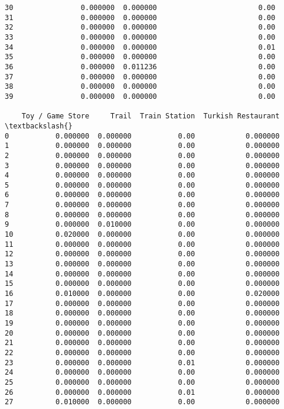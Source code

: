 \documentclass[11pt]{article}
\begin{document}
\begin{tcolorbox}[breakable, size=fbox, boxrule=.5pt, pad at break*=1mm, opacityfill=0]
\begin{Verbatim}[commandchars=\\\{\}]
30                0.000000  0.000000                        0.00
31                0.000000  0.000000                        0.00
32                0.000000  0.000000                        0.00
33                0.000000  0.000000                        0.00
34                0.000000  0.000000                        0.01
35                0.000000  0.000000                        0.00
36                0.000000  0.011236                        0.00
37                0.000000  0.000000                        0.00
38                0.000000  0.000000                        0.00
39                0.000000  0.000000                        0.00

    Toy / Game Store     Trail  Train Station  Turkish Restaurant  \textbackslash{}
0           0.000000  0.000000           0.00            0.000000
1           0.000000  0.000000           0.00            0.000000
2           0.000000  0.000000           0.00            0.000000
3           0.000000  0.000000           0.00            0.000000
4           0.000000  0.000000           0.00            0.000000
5           0.000000  0.000000           0.00            0.000000
6           0.000000  0.000000           0.00            0.000000
7           0.000000  0.000000           0.00            0.000000
8           0.000000  0.000000           0.00            0.000000
9           0.000000  0.010000           0.00            0.000000
10          0.020000  0.000000           0.00            0.000000
11          0.000000  0.000000           0.00            0.000000
12          0.000000  0.000000           0.00            0.000000
13          0.000000  0.000000           0.00            0.000000
14          0.000000  0.000000           0.00            0.000000
15          0.000000  0.000000           0.00            0.000000
16          0.010000  0.000000           0.00            0.020000
17          0.000000  0.000000           0.00            0.000000
18          0.000000  0.000000           0.00            0.000000
19          0.000000  0.000000           0.00            0.000000
20          0.000000  0.000000           0.00            0.000000
21          0.000000  0.000000           0.00            0.000000
22          0.000000  0.000000           0.00            0.000000
23          0.000000  0.000000           0.01            0.000000
24          0.000000  0.000000           0.00            0.000000
25          0.000000  0.000000           0.00            0.000000
26          0.000000  0.000000           0.01            0.000000
27          0.010000  0.000000           0.00            0.000000

\end{Verbatim}
\end{tcolorbox}
\end{document}
